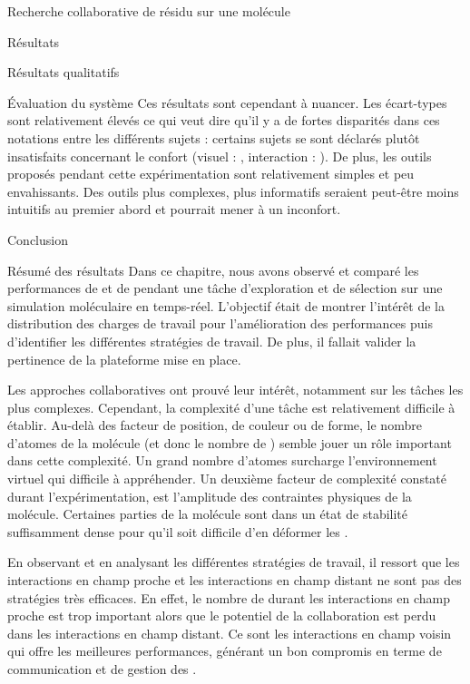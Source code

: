 \documentclass[myfrancais,ngerman,english,french]{mythesis}
\begin{document}
\begin{mychapter}{Recherche collaborative de résidu sur une molécule}
\begin{mysection}{Résultats}
\begin{mysubsection}{Résultats qualitatifs}
\begin{mysubsubsection}{Évaluation du système}
					Ces résultats sont cependant à nuancer.
					Les écart-types sont relativement élevés ce qui veut dire qu'il y a de fortes disparités dans ces notations entre les différents sujets : certains sujets se sont déclarés plutôt insatisfaits concernant le confort (visuel : \mynum{2}, interaction : ).
					De plus, les outils proposés pendant cette expérimentation sont relativement simples et peu envahissants.
					Des outils plus complexes, plus informatifs seraient peut-être moins intuitifs au premier abord et pourrait mener à un inconfort.
				\end{mysubsubsection}
			\end{mysubsection}
		\end{mysection}
		\begin{mysection}{Conclusion}
			\begin{mysubsection}{Résumé des résultats}
				Dans ce chapitre, nous avons observé et comparé les performances de  et de  pendant une tâche d'exploration et de sélection sur une simulation moléculaire en temps-réel.
				L'objectif était de montrer l'intérêt de la distribution des charges de travail pour l'amélioration des performances puis d'identifier les différentes stratégies de travail.
				De plus, il fallait valider la pertinence de la plateforme mise en place.

				Les approches collaboratives ont prouvé leur intérêt, notamment sur les tâches les plus complexes.
				Cependant, la complexité d'une tâche est relativement difficile à établir.
				Au-delà des facteur de position, de couleur ou de forme, le nombre d'atomes de la molécule (et donc le nombre de ) semble jouer un rôle important dans cette complexité.
				Un grand nombre d'atomes surcharge l'environnement virtuel qui difficile à appréhender.
				Un deuxième facteur de complexité constaté durant l'expérimentation, est l'amplitude des contraintes physiques de la molécule.
				Certaines parties de la molécule sont dans un état de stabilité suffisamment dense pour qu'il soit difficile d'en déformer les .

				En observant et en analysant les différentes stratégies de travail, il ressort que les interactions en champ proche et les interactions en champ distant ne sont pas des stratégies très efficaces.
				En effet, le nombre de  durant les interactions en champ proche est trop important alors que le potentiel de la collaboration est perdu dans les interactions en champ distant.
				Ce sont les interactions en champ voisin qui offre les meilleures performances, générant un bon compromis en terme de communication et de gestion des .


\end{mysubsection}
\end{mysection}
\end{mychapter}
\end{document}
